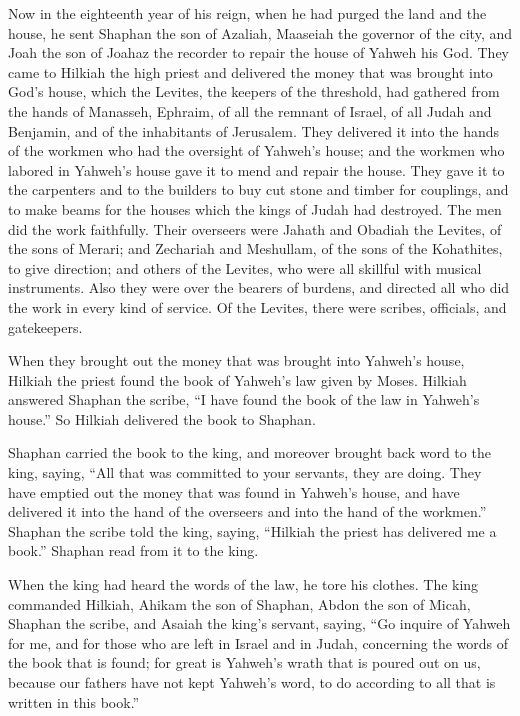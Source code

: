  Now in the eighteenth year of his reign, when he had purged
the land and the house, he sent Shaphan the son of Azaliah, Maaseiah the
governor of the city, and Joah the son of Joahaz the recorder to repair
the house of Yahweh his God.  They came to Hilkiah the high
priest and delivered the money that was brought into God's house, which
the Levites, the keepers of the threshold, had gathered from the hands
of Manasseh, Ephraim, of all the remnant of Israel, of all Judah and
Benjamin, and of the inhabitants of Jerusalem.  They
delivered it into the hands of the workmen who had the oversight of
Yahweh's house; and the workmen who labored in Yahweh's house gave it to
mend and repair the house.  They gave it to the carpenters
and to the builders to buy cut stone and timber for couplings, and to
make beams for the houses which the kings of Judah had destroyed.
 The men did the work faithfully. Their overseers were
Jahath and Obadiah the Levites, of the sons of Merari; and Zechariah and
Meshullam, of the sons of the Kohathites, to give direction; and others
of the Levites, who were all skillful with musical instruments.
 Also they were over the bearers of burdens, and directed
all who did the work in every kind of service. Of the Levites, there
were scribes, officials, and gatekeepers.

 When they brought out the money that was brought into
Yahweh's house, Hilkiah the priest found the book of Yahweh's law given
by Moses.  Hilkiah answered Shaphan the scribe, ``I have
found the book of the law in Yahweh's house.'' So Hilkiah delivered the
book to Shaphan.

 Shaphan carried the book to the king, and moreover brought
back word to the king, saying, ``All that was committed to your
servants, they are doing.  They have emptied out the money
that was found in Yahweh's house, and have delivered it into the hand of
the overseers and into the hand of the workmen.''  Shaphan
the scribe told the king, saying, ``Hilkiah the priest has delivered me
a book.'' Shaphan read from it to the king.

 When the king had heard the words of the law, he tore his
clothes.  The king commanded Hilkiah, Ahikam the son of
Shaphan, Abdon the son of Micah, Shaphan the scribe, and Asaiah the
king's servant, saying,  ``Go inquire of Yahweh for me, and
for those who are left in Israel and in Judah, concerning the words of
the book that is found; for great is Yahweh's wrath that is poured out
on us, because our fathers have not kept Yahweh's word, to do according
to all that is written in this book.''

